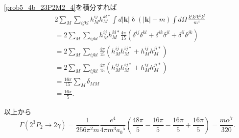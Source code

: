 \eqref{prob5_4b_23P2M2_4}を積分すれば
\begin{align*}
  & 2 \sum_M \sum_{ijkl} h_M^{ij} h_M^{kl\ast} \int d\lvert\boldsymbol{k}\rvert
  \mathop\delta(\lvert\boldsymbol{k}\rvert - m) \int d\Omega \, \frac{k^ik^jk^kk^l}{m^4} \\
  &= 2 \sum_M \sum_{ijkl} h_M^{ij} h_M^{kl\ast}
   \frac{4\pi}{15} ( \delta^{ij}\delta^{kl} + \delta^{ik}\delta^{jl} + \delta^{il}\delta^{jk} ) \\
  &= 2 \sum_M \sum_{ijkl} \frac{4\pi}{15} ( h_M^{ij} h_M^{ij\ast} + h_M^{ij} h_M^{ji\ast} ) \\
  &= 2 \sum_M \sum_{ijkl} \frac{4\pi}{15} ( h_M^{ij} h_M^{ij\ast} + h_M^{ij} h_M^{ji\ast} ) \\
  &= \frac{16\pi}{15} \sum_M \delta_{MM} \\
  &= \frac{16\pi}{5} .
\end{align*}

以上から
\[
\Gamma(2^3P_2 \to 2\gamma)
= \frac{1}{256 \pi^2 m} \frac{e^4}{4\pi m^3 a_0{}^5}
\left( \frac{48\pi}{5} - \frac{16\pi}{5} - \frac{16\pi}{5} + \frac{16\pi}{5}\right)
= \frac{m\alpha^7}{320} .
\]
